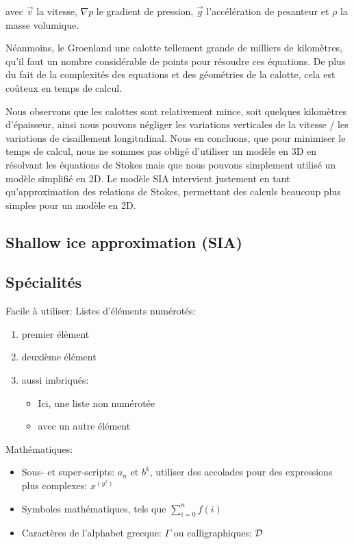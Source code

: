 \documentclass{article}
\begin{document}
avec $\vec{v}$ la vitesse, $\nabla p$ le gradient de pression, $\vec{g}$ l'accélération de pesanteur et $\rho$ la masse volumique.

Néanmoins, le Groenland  une calotte tellement grande de milliers de kilomètres, qu'il faut un nombre considérable de points pour résoudre ces équations. De plus du fait de la complexités des equations et des géométries de la calotte, cela est coûteux en temps de calcul. 

Nous observons que les calottes sont relativement mince, soit quelques kilomètres d'épaisseur, ainsi nous pouvons négliger les variations verticales de la vitesse / les variations de cisaillement longitudinal. Nous en concluons, que pour minimiser le temps de calcul, nous ne sommes pas obligé d'utiliser un modèle en 3D en résolvant les équations de Stokes mais que nous pouvons simplement utilisé un modèle simplifié en 2D. Le modèle SIA intervient justement en tant qu’approximation des relations de Stokes, permettant des calculs beaucoup plus simples pour un modèle en 2D.

 
\subsection{Shallow ice approximation (SIA)}


\subsection{Spécialités}

Facile à utiliser: Listes d'éléments numérotés:
\begin{enumerate}
\item premier élément
\item deuxième élément
\item aussi imbriqués:
%
\begin{itemize}
\item Ici, une liste non numérotée
\item avec un autre élément
\end{itemize}
%
\end{enumerate}

Mathématiques:
\begin{itemize}
\item Sous- et super-scripts: $a_n$ et $b^k$, utiliser des accolades
  pour des expressions plus complexes: $x^{(y^z)}$

\item Symboles mathématiques, tels que $\sum_{i=0}^{n} f(i)$

\item Caractères de l'alphabet grecque: $\Gamma$ ou calligraphiques: ${\cal D}$
\end{itemize}
\end{document}
